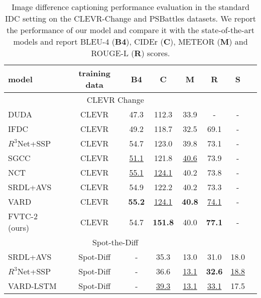\documentclass[10pt,twocolumn,letterpaper]{article}
\begin{document}
\begin{table}[ht]
\caption{Image difference captioning performance evaluation in the standard IDC setting on the CLEVR-Change and PSBattles datasets.
We report the performance of our model and compare it with the state-of-the-art models and report 
BLEU-4 (\textbf{B4}), CIDEr (\textbf{C}), METEOR (\textbf{M}) and ROUGE-L (\textbf{R}) scores.}
\label{tab:idc}
\vskip 0.15in
\begin{center}
\begin{small}
\begin{sc}
    \begin{tabular}{lccccccr}
         \toprule
         \textbf{model}&  {training data}&  \textbf{B4}&  \textbf{C}&  \textbf{M}& \textbf{R}  & \textbf{S}\\
         \midrule
         \multicolumn{6}{c}{CLEVR Change}\\
         \midrule
         DUDA \cite{DUDA}& CLEVR & 47.3 & 112.3 & 33.9 & - & -\\
         IFDC \cite{IFDC} & CLEVR & 49.2 & 118.7 & 32.5 & 69.1& -\\
         $R^3$Net+SSP \cite{R3Net} & CLEVR & 54.7 & 123.0 & 39.8 & 73.1& -\\
         SGCC \cite{SGCC} & CLEVR & \underline{51.1} & 121.8 & \underline{40.6} & 73.9& -\\
         NCT \cite{NCT} & CLEVR & \underline{55.1} & \underline{124.1} & 40.2 & 73.8& -\\
         SRDL+AVS \cite{sem}& CLEVR & 54.9 & 122.2 & 40.2 & 73.3& -\\
         VARD \cite{VARD}& CLEVR & \bf 55.2& \underline{124.1} & \bf 40.8 & \underline{74.1}& - \\
         FVTC-2 (ours) & CLEVR & 54.7 & \bf 151.8 & 40.0 & \bf 77.1& -\\
         \midrule
         \multicolumn{6}{c}{Spot-the-Diff}\\
         \midrule
         SRDL+AVS \cite{sem}& Spot-Diff & - & 35.3 & 13.0 & 31.0 & 18.0\\
         $R^3$Net+SSP \cite{R3Net} & Spot-Diff & - & 36.6 & \underline{13.1} & \bf 32.6 & \underline{18.8} \\
         VARD-LSTM \cite{VARD}& Spot-Diff & - & \underline{39.3} & \underline{13.1} & \underline{33.1} & 17.5\\

\end{tabular}
\end{sc}
\end{small}
\end{center}
\end{table}
\end{document}
